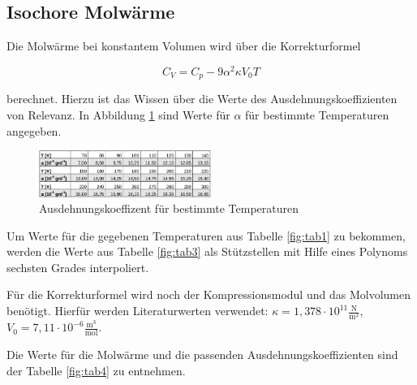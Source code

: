 \subsection{Isochore Molwärme}
Die Molwärme bei konstantem Volumen wird über die Korrekturformel

\begin{equation}
C_V=C_p-9\alpha^2\kappa V_0T
\end{equation}

berechnet. Hierzu ist das Wissen über die Werte des Ausdehnungskoeffizienten von Relevanz. In Abbildung \ref{fig:abb1} sind Werte für \(\alpha\) für bestimmte Temperaturen angegeben.

\begin{figure}
	\centering
		\includegraphics[width=0.5\textwidth]{alpha.png}
	\caption{Ausdehnungskoeffizent für bestimmte Temperaturen}
	\label{fig:abb1}
\end{figure}

\noindent Um Werte für die gegebenen Temperaturen aus Tabelle \ref{fig:tab1} zu bekommen, werden die Werte aus Tabelle \ref{fig:tab3} als Stützstellen mit Hilfe eines Polynoms sechsten Grades interpoliert. 

\noindent Für die Korrekturformel wird noch der Kompressionsmodul und das Molvolumen benötigt. Hierfür werden Literaturwerten verwendet: \(\kappa=1,378\cdot10^{11}\frac{\text{N}}{\text{m}^2}\), \(V_0=7,11\cdot10^{-6}\frac{\text{m}^3}{\text{mol}}\). 

\noindent Die Werte für die Molwärme und die passenden Ausdehnungskoeffizienten sind der Tabelle \ref{fig:tab4} zu entnehmen.

